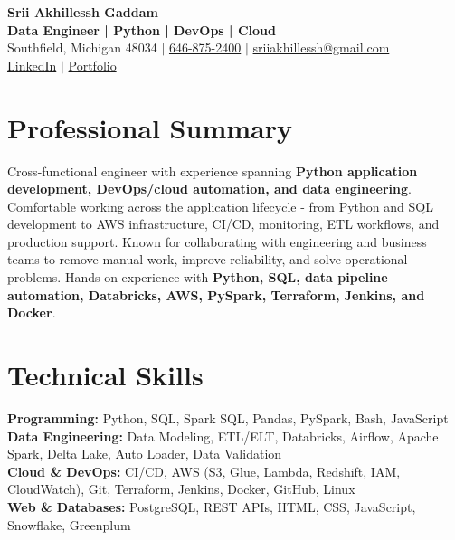\documentclass[letterpaper,10pt]{article}
\begin{document}
\fontsize{9.35pt}{10.45pt}\selectfont

\begin{center}
    {\LARGE \textbf{Srii Akhillessh Gaddam}} \\[-1pt]
    \textbf{Data Engineer | Python | DevOps | Cloud} \\[2pt]
    Southfield, Michigan 48034 $|$
    \href{tel:6468752400}{646-875-2400} $|$
    \href{mailto:sriiakhillessh@gmail.com}{sriiakhillessh@gmail.com} \\[1pt]
    \href{https://www.linkedin.com/in/srii-akhiilessh-gaddam-b48668191/}{LinkedIn} $|$
    \href{https://sriiakhillesshg.github.io/portfolio/}{Portfolio}
\end{center}
\vspace{-8pt}

\section{Professional Summary}
\small{Cross-functional engineer with experience spanning \textbf{Python application development, DevOps/cloud automation, and data engineering}. Comfortable working across the application lifecycle - from Python and SQL development to AWS infrastructure, CI/CD, monitoring, ETL workflows, and production support. Known for collaborating with engineering and business teams to remove manual work, improve reliability, and solve operational problems. Hands-on experience with \textbf{Python, SQL, data pipeline automation, Databricks, AWS, PySpark, Terraform, Jenkins, and Docker}.}

\section{Technical Skills}
\small{
\textbf{Programming:} Python, SQL, Spark SQL, Pandas, PySpark, Bash, JavaScript \\
\textbf{Data Engineering:} Data Modeling, ETL/ELT, Databricks, Airflow, Apache Spark, Delta Lake, Auto Loader, Data Validation \\
\textbf{Cloud \& DevOps:} CI/CD, AWS (S3, Glue, Lambda, Redshift, IAM, CloudWatch), Git, Terraform, Jenkins, Docker, GitHub, Linux \\
\textbf{Web \& Databases:} PostgreSQL, REST APIs, HTML, CSS, JavaScript, Snowflake, Greenplum
}

\end{document}
